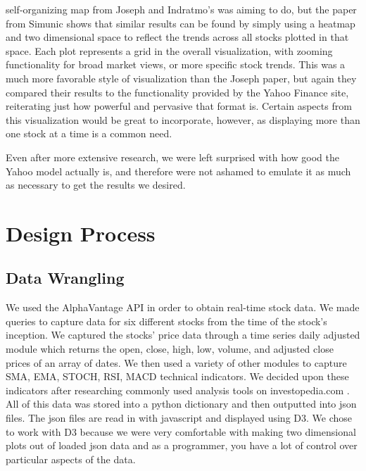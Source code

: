 \documentclass{vgtc}                          %
\begin{document}
self-organizing map from Joseph and Indratmo’s was aiming to do, but the paper from Simunic \cite{article}
shows that similar results can be found by simply using a heatmap and two dimensional space to reflect
the trends across all stocks plotted in that space. Each plot represents a grid in the overall visualization,
with zooming functionality for broad market views, or more specific stock trends. This was a much more
favorable style of visualization than the Joseph paper, but again they compared their results to the
functionality provided by the Yahoo Finance site, reiterating just how powerful and pervasive that
format is. Certain aspects from this visualization would be great to incorporate, however, as displaying
more than one stock at a time is a common need.

Even after more extensive research, we were left surprised with how good the Yahoo model
actually is, and therefore were not ashamed to emulate it as much as necessary to get the results we
desired. 
\section{Design Process}
\subsection{Data Wrangling}
We used the AlphaVantage API \cite{alpha} in order to obtain real-time stock data. We made queries to
capture data for six different stocks from the time of the stock’s inception. We captured the stocks’
price data through a time series daily adjusted module which returns the open, close, high, low, volume,
and adjusted close prices of an array of dates. We then used a variety of other modules to capture SMA,
EMA, STOCH, RSI, MACD technical indicators. We decided upon these indicators after researching commonly used analysis tools on investopedia.com \cite{invest}.  All of this data was stored into a python dictionary and then
outputted into json files. The json files are read in with javascript and displayed using D3.  We chose to work with D3 because we were very comfortable with making two dimensional plots out of loaded json data and as a programmer, you have a lot of control over particular aspects of the data.
\end{document}
